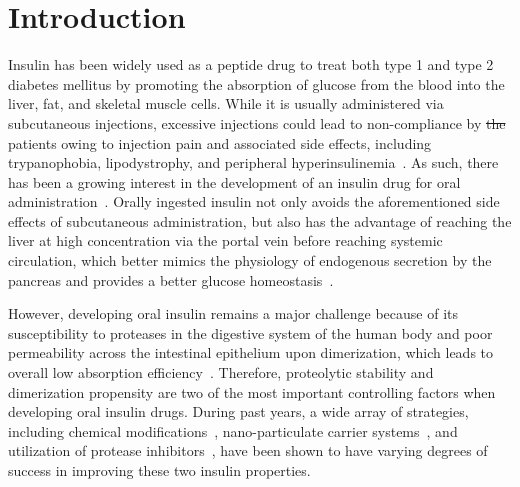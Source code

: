 \documentclass[9pt]{elife}
\providecommand{\DIFdeltex}[1]{{\protect\color{red}\sout{#1}}}                      %
\providecommand{\DIFdelbegin}{} %
\providecommand{\DIFdelend}{} %
\providecommand{\DIFdel}[1]{\texorpdfstring{\DIFdeltex{#1}}{}} %
\begin{document}
\section{Introduction}
Insulin has been widely used as a peptide drug to treat both type 1 and type 2 diabetes mellitus by promoting the absorption of glucose from the blood into the liver, fat, and skeletal muscle cells. While it is usually administered via subcutaneous injections, excessive injections could lead to non-compliance by \DIFdelbegin \DIFdel{the }\DIFdelend patients owing to injection pain and associated side effects, including trypanophobia, lipodystrophy, and peripheral hyperinsulinemia~\cite{carino1999oral}. As such, there has been a growing interest in the development of an insulin drug for oral administration~\cite{carino1999oral, fonte2013oral, gedawy2018oral}. Orally ingested insulin not only avoids the aforementioned side effects of subcutaneous administration, but also has the advantage of reaching the liver at high concentration via the portal vein before reaching systemic circulation, which better mimics the physiology of endogenous secretion by the pancreas and provides a better glucose homeostasis~\cite{hoffman1997pharmacokinetic, owens2002new}. 
\DIFdelbegin %

\DIFdelend However, developing oral insulin remains a major challenge because of its susceptibility to proteases in the digestive system of the human body and poor permeability across the intestinal epithelium upon dimerization, which leads to overall low absorption efficiency~\cite{bruno2013basics}. Therefore, proteolytic stability and dimerization propensity are two of the most important controlling factors when developing oral insulin drugs. During past years, a wide array of strategies, including chemical modifications~\cite{hinds2002effects, clement2002oral}, nano-particulate carrier systems~\cite{deng2017selenium, bhattacharyya2017preparation, zhou2020nanocomposite}, and utilization of protease inhibitors~\cite{agarwal2000oral}, have been shown to have varying degrees of success in improving these two insulin properties. 
\end{document}
